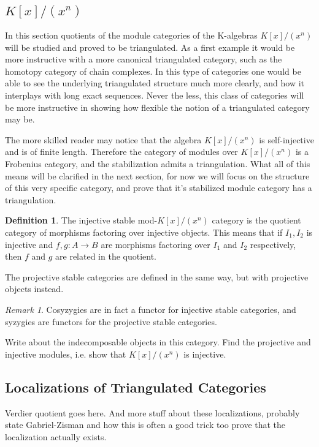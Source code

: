 \documentclass[12pt]{article}
\theoremstyle{definition}
\newtheorem{definition}{Definition}[section]
\theoremstyle{remark}
\newtheorem*{remark}{Remark}
\begin{document}
        \subsection{$K[x]/(x^n)$}
            In this section quotients of the module categories of the K-algebras $K[x]/(x^n)$ will be studied and proved to be triangulated. As a first example it would be more instructive with a more canonical triangulated category, such as the homotopy category of chain complexes. In this type of categories one would be able to see the underlying triangulated structure much more clearly, and how it interplays with long exact sequences. Never the less, this class of categories will be more instructive in showing how flexible the notion of a triangulated category may be.


            The more skilled reader may notice that the algebra $K[x]/(x^n)$ is self-injective and is of finite length. Therefore the category of modules over $K[x]/(x^n)$ is a Frobenius category, and the stabilization admits a triangulation. What all of this means will be clarified in the next section, for now we will focus on the structure of this very specific category, and prove that it's stabilized module category has a triangulation.

            \begin{definition}
                The injective stable mod-$K[x]/(x^n)$ category is the quotient category of morphisms factoring over injective objects. This means that if $I_1, I_2$ is injective and $f,g:A\rightarrow B$ are morphisms factoring over $I_1$ and $I_2$ respectively, then $f$ and $g$ are related in the quotient.

                The projective stable categories are defined in the same way, but with projective objects instead.
            \end{definition}

            \begin{remark}
                Cosyzygies are in fact a functor for injective stable categories, and syzygies are functors for the projective stable categories.
            \end{remark}

            Write about the indecomposable objects in this category. Find the projective and injective modules, i.e. show that $K[x]/(x^n)$ is injective.

        \subsection{Localizations of Triangulated Categories}
            Verdier quotient goes here. And more stuff about these localizations, probably state Gabriel-Zisman and how this is often a good trick too prove that the localization actually exists.
\end{document}
